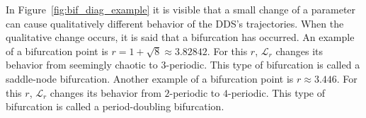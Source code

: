 \begin{remark}
    In Figure~\ref{fig:bif_diag_example} it is visible that a small change of a parameter can cause qualitatively different behavior of the DDS's trajectories.
    When the qualitative change occurs, it is said that a bifurcation has occurred.
    An example of a bifurcation point is $r = 1+\sqrt{8} \approx 3.82842$. For this $r$, $\mathcal{L}_{r}$ changes its behavior from seemingly chaotic to $3$-periodic. 
    This type of bifurcation is called a saddle-node bifurcation.
    Another example of a bifurcation point is $r \approx 3.446$. For this $r$, $\mathcal{L}_{r}$ changes its behavior from $2$-periodic to $4$-periodic.
    This type of bifurcation is called a period-doubling bifurcation.
\end{remark}

\endinput
